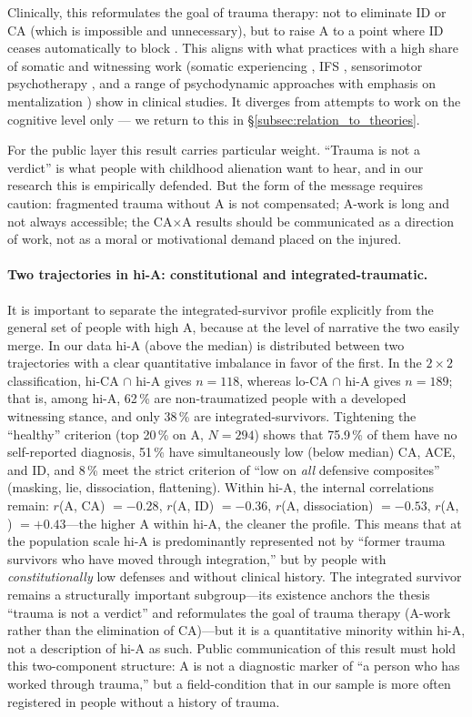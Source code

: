 Clinically, this reformulates the goal of trauma therapy: not to eliminate ID or CA (which is impossible and unnecessary), but to raise A to a point where ID ceases automatically to block \EAF{}. This aligns with what practices with a high share of somatic and witnessing work (somatic experiencing \citep{levine2015}, IFS \citep{schwartz1995}, sensorimotor psychotherapy \citep{ogden2006}, and a range of psychodynamic approaches with emphasis on mentalization \citep{fonagy2008}) show in clinical studies. It diverges from attempts to work on the cognitive level only --- we return to this in §\ref{subsec:relation_to_theories}.

For the public layer this result carries particular weight. ``Trauma is not a verdict'' is what people with childhood alienation want to hear, and in our research this is empirically defended. But the form of the message requires caution: fragmented trauma without A is not compensated; A-work is long and not always accessible; the CA$\times$A results should be communicated as a direction of work, not as a moral or motivational demand placed on the injured.

\paragraph{Two trajectories in hi-A: constitutional and integrated-traumatic.} It is important to separate the integrated-survivor profile explicitly from the general set of people with high A, because at the level of narrative the two easily merge. In our data hi-A (above the median) is distributed between two trajectories with a clear quantitative imbalance in favor of the first. In the $2\times 2$ classification, hi-CA $\cap$ hi-A gives $n = 118$, whereas lo-CA $\cap$ hi-A gives $n = 189$; that is, among hi-A, 62\,\% are non-traumatized people with a developed witnessing stance, and only 38\,\% are integrated-survivors. Tightening the ``healthy'' criterion (top 20\,\% on A, $N = 294$) shows that 75.9\,\% of them have no self-reported diagnosis, 51\,\% have simultaneously low (below median) CA, ACE, and ID, and 8\,\% meet the strict criterion of ``low on \emph{all} defensive composites'' (masking, lie, dissociation, flattening). Within hi-A, the internal correlations remain: $r$(A, CA) $= -0.28$, $r$(A, ID) $= -0.36$, $r$(A, dissociation) $= -0.53$, $r$(A, \EAF{}) $= +0.43$---the higher A within hi-A, the cleaner the profile. This means that at the population scale hi-A is predominantly represented not by ``former trauma survivors who have moved through integration,'' but by people with \emph{constitutionally} low defenses and without clinical history. The integrated survivor remains a structurally important subgroup---its existence anchors the thesis ``trauma is not a verdict'' and reformulates the goal of trauma therapy (A-work rather than the elimination of CA)---but it is a quantitative minority within hi-A, not a description of hi-A as such. Public communication of this result must hold this two-component structure: A is not a diagnostic marker of ``a person who has worked through trauma,'' but a field-condition that in our sample is more often registered in people without a history of trauma.

